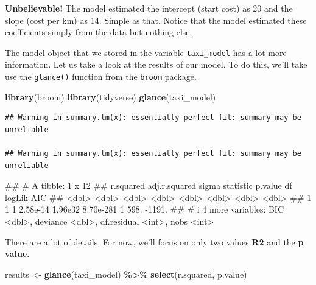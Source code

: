 \documentclass[
]{book}
\newenvironment{Shaded}{\begin{snugshade}}{\end{snugshade}}
\newcommand{\FunctionTok}[1]{\textcolor[rgb]{0.13,0.29,0.53}{\textbf{#1}}}
\newcommand{\NormalTok}[1]{#1}
\newcommand{\OtherTok}[1]{\textcolor[rgb]{0.56,0.35,0.01}{#1}}
\newcommand{\SpecialCharTok}[1]{\textcolor[rgb]{0.81,0.36,0.00}{\textbf{#1}}}
\begin{document}
\textbf{Unbelievable!} The model estimated the intercept (start cost) as 20 and the slope (cost per km) as 14. Simple as that. Notice that the model estimated these coefficients simply from the data but nothing else.

The model object that we stored in the variable \texttt{taxi\_model} has a lot more information. Let us take a look at the results of our model. To do this, we'll take use the \texttt{glance()} function from the \texttt{broom} package.

\begin{Shaded}
\begin{Highlighting}[]
\FunctionTok{library}\NormalTok{(broom)}
\FunctionTok{library}\NormalTok{(tidyverse)}
\FunctionTok{glance}\NormalTok{(taxi\_model)}
\end{Highlighting}
\end{Shaded}

\begin{verbatim}
## Warning in summary.lm(x): essentially perfect fit: summary may be unreliable

## Warning in summary.lm(x): essentially perfect fit: summary may be unreliable
\end{verbatim}

\begin{Shaded}
\begin{Highlighting}[]
\NormalTok{\#\# \# A tibble: 1 x 12}
\NormalTok{\#\#   r.squared adj.r.squared    sigma statistic   p.value    df logLik    AIC}
\NormalTok{\#\#       \textless{}dbl\textgreater{}         \textless{}dbl\textgreater{}    \textless{}dbl\textgreater{}     \textless{}dbl\textgreater{}     \textless{}dbl\textgreater{} \textless{}dbl\textgreater{}  \textless{}dbl\textgreater{}  \textless{}dbl\textgreater{}}
\NormalTok{\#\# 1         1             1 2.58e{-}14   1.96e32 8.70e{-}281     1   598. {-}1191.}
\NormalTok{\#\# \# i 4 more variables: BIC \textless{}dbl\textgreater{}, deviance \textless{}dbl\textgreater{}, df.residual \textless{}int\textgreater{}, nobs \textless{}int\textgreater{}}
\end{Highlighting}
\end{Shaded}

There are a lot of details. For now, we'll focus on only two values \textbf{R2} and the \textbf{p value}.

\begin{Shaded}
\begin{Highlighting}[]
\NormalTok{results }\OtherTok{\textless{}{-}} \FunctionTok{glance}\NormalTok{(taxi\_model) }\SpecialCharTok{\%\textgreater{}\%}
  \FunctionTok{select}\NormalTok{(r.squared, p.value)}
\end{Highlighting}
\end{Shaded}
\end{document}
